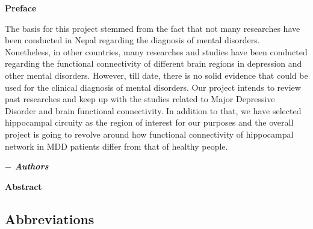 \documentclass[12pt]{article}
\begin{document}
\begingroup
  \fontsize{12pt}{14pt}\selectfont
  

\clearpage
\setcounter{page}{1}
\hskip180pt {\textbf{\centering \Large Preface} }
\vskip40pt

\noindent
The basis for this project stemmed from the fact that not many
researches have been conducted in Nepal regarding the diagnosis of
mental disorders. Nonetheless, in other countries, many researches and
studies have been conducted regarding the functional connectivity of
different brain regions in depression and other mental
disorders. However, till date, there is no solid evidence that could
be used for the clinical diagnosis of mental disorders. Our project
intends to review past researches and keep up with the studies related
to Major Depressive Disorder and brain functional connectivity. In
addition to that, we have selected hippocampal circuity as the region
of interest for our purposes and the overall project is going to
revolve around how functional connectivity of hippocampal network in
MDD patients differ from that of healthy people.

\hspace*{133mm}\textbf{\textit {$-$ Authors}}
\newpage

\hskip180pt {\textbf{\centering \Large Abstract} }
\vskip2pt

\newpage

\thispagestyle{empty}
\listoffigures

\thispagestyle{empty}
\listoftables
\newpage


\begin{center}
  \section*{Abbreviations}
\end{center}

\begin{acronym}
\end{acronym}
\end{document}
